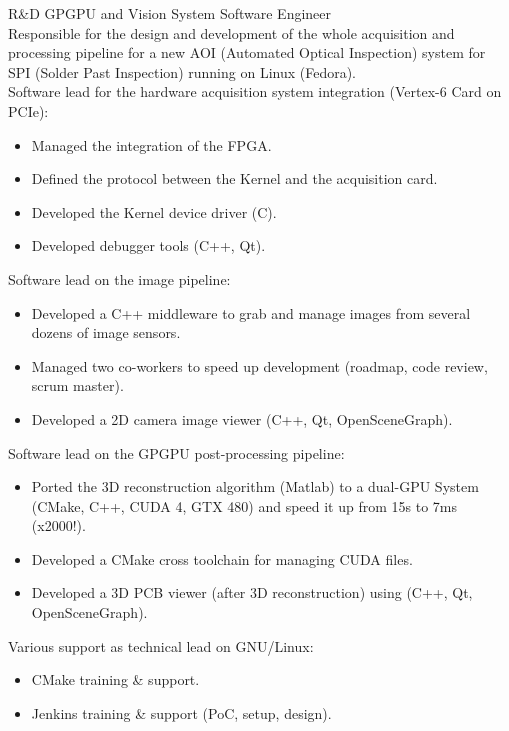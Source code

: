 \documentclass{article}
\begin{document}
\begin{llist}
 {
R\&D GPGPU and Vision System Software Engineer\\
Responsible for the design and development of the whole acquisition and processing pipeline
for a new AOI (Automated Optical Inspection) system for SPI (Solder Past Inspection)
 running on Linux (Fedora).\\
Software lead for the hardware acquisition system integration (Vertex-6 Card on PCIe):
\vspace{-0.50cm}
\begin{itemize}
	\item Managed the integration of the FPGA.
	\item Defined the protocol between the Kernel and the acquisition card.
	\item Developed the Kernel device driver (C).
	\item Developed debugger tools (C++, Qt).
\end{itemize}
Software lead on the image pipeline:
\vspace{-0.50cm}
\begin{itemize}
	\item Developed a C++ middleware to grab and manage images from several dozens of image sensors.
	\item Managed two co-workers to speed up development (roadmap, code review, scrum master).
	\item Developed a 2D camera image viewer (C++, Qt, OpenSceneGraph).
\end{itemize}
Software lead on the GPGPU post-processing pipeline:
\vspace{-0.50cm}
\begin{itemize}
	\item Ported the 3D reconstruction algorithm (Matlab) to a dual-GPU System (CMake, C++, CUDA 4, GTX 480)
		and speed it up from 15s to 7ms (x2000!).
	\item Developed a CMake cross toolchain for managing CUDA files.
	\item Developed a 3D PCB viewer (after 3D reconstruction) using (C++, Qt, OpenSceneGraph).
\end{itemize}
Various support as technical lead on GNU/Linux:
\vspace{-0.50cm}
\begin{itemize}
	\item CMake training \& support.
	\item Jenkins training \& support (PoC, setup, design).

\end{itemize}}
\end{llist}
\end{document}
